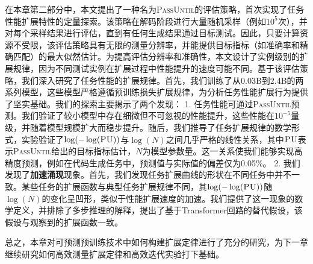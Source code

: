 在本章第二部分中，本文提出了一种名为\textsc{PassUntil}的评估策略，首次实现了任务性能扩展特性的定量探索。该策略在解码阶段进行大量随机采样（例如$10^5$次），并对每个采样结果进行评估，直到有任何生成结果通过目标测试。因此，只要计算资源不受限，该评估策略具有无限的测量分辨率，并能提供目标指标（如准确率和精确匹配）的最大似然估计。为提高评估分辨率和准确性，本文设计了实例级别的扩展规律，因为不同测试实例在扩展过程中性能提升的速度可能不同。基于该评估策略，我们深入研究了任务性能的扩展规律。首先，我们训练了从0.03B到2.4B的两系列模型，这些模型严格遵循预训练损失扩展规律，为分析任务性能扩展行为提供了坚实基础。我们的探索主要揭示了两个发现：
1. 任务性能可通过\textsc{PassUntil}预测。我们验证了较小模型中存在细微但不可忽视的性能提升，这些性能在$10^{-5}$量级，并随着模型规模扩大而稳步提升。随后，我们推导了{任务扩展规律}的数学形式，实验验证了\(\log(-\log(\textsc{PU}))\)与\(\log(N)\)之间几乎严格的线性关系，其中$\textsc{PU}$表示\textsc{PassUntil}给出的目标指标估计，$N$为模型参数量。这一关系使我们能够实现高精度预测，例如在代码生成任务中，预测值与实际值的偏差仅为0.05\%。
2. 我们发现了\textbf{加速涌现}现象。首先，我们发现任务扩展曲线的形状在不同任务中并不一致。某些任务的扩展函数与典型任务扩展规律不同，其\(\log(-\log(\textsc{PU}))\)随\(\log(N)\)的变化呈凹形，类似于性能扩展速度的加速。我们提供了这一现象的数学定义，并排除了多步推理的解释，提出了基于Transformer回路的替代假设，该假设与观察到的扩展函数一致。

总之，本章对可预测预训练技术中如何构建扩展定律进行了充分的研究，为下一章继续研究如何高效测量扩展定律和高效迭代实验打下基础。